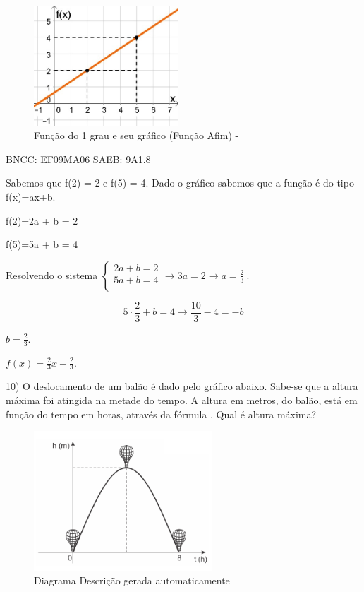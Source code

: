\begin{escolha}
{{{\begin{escolha}
{{{\begin{figure}
\centering
\includegraphics[width=2.14105in,height=1.76667in]{./_SAEB_9_MAT/media/image150.jpeg}
\caption{Função do 1 grau e seu gráfico (Função Afim) -}
\end{figure}

BNCC: EF09MA06 SAEB: 9A1.8

Sabemos que f(2) = 2 e f(5) = 4. Dado o gráfico sabemos que a função é
do tipo f(x)=ax+b.

f(2)=2a + b = 2

f(5)=5a + b = 4

Resolvendo o sistema
\(\left\{ \begin{matrix} 2a + b = 2 \\ 5a + b = 4 \\ \end{matrix} \rightarrow 3a = 2 \rightarrow a = \frac{2}{3} \right.\ \).

\[5 \cdot \frac{2}{3} + b = 4 \rightarrow \frac{10}{3} - 4 = - b\]

\(b = \frac{2}{3}\).

\(f\left( x \right) = \frac{2}{3}x + \frac{2}{3}\).

10) O deslocamento de um balão é dado pelo gráfico abaixo. Sabe-se que a
altura máxima foi atingida na metade do tempo. A altura em metros, do
balão, está em função do tempo em horas, através da fórmula . Qual é
altura máxima?

\begin{figure}
\centering
\includegraphics[width=2.62523in,height=2.05851in]{./_SAEB_9_MAT/media/image154.png}
\caption{Diagrama Descrição gerada automaticamente}
\end{figure}

}}}
\end{escolha}}}}
\end{escolha}
